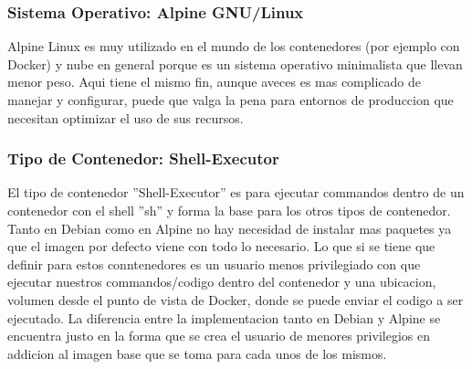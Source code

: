 \subsubsection{Sistema Operativo: Alpine GNU/Linux}
Alpine Linux es muy utilizado en el mundo de los contenedores (por ejemplo con Docker) y nube en general porque es un sistema operativo minimalista que llevan menor peso. Aqui tiene el mismo fin, aunque aveces es mas complicado de manejar y configurar, puede que valga la pena para entornos de produccion que necesitan optimizar el uso de sus recursos.

\subsubsection{Tipo de Contenedor: Shell-Executor}
El tipo de contenedor ''Shell-Executor'' es para ejecutar commandos dentro de un contenedor con el shell ''sh'' y forma la base para los otros tipos de contenedor. Tanto en Debian como en Alpine no hay necesidad de instalar mas paquetes ya que el imagen por defecto viene con todo lo necesario. Lo que si se tiene que definir para estos conntenedores es un usuario menos privilegiado con que ejecutar nuestros commandos/codigo dentro del contenedor y una ubicacion, volumen desde el punto de vista de Docker, donde se puede enviar el codigo a ser ejecutado. La diferencia entre la implementacion tanto en Debian y Alpine se encuentra justo en la forma que se crea el usuario de menores privilegios en addicion al imagen base que se toma para cada unos de los mismos.

